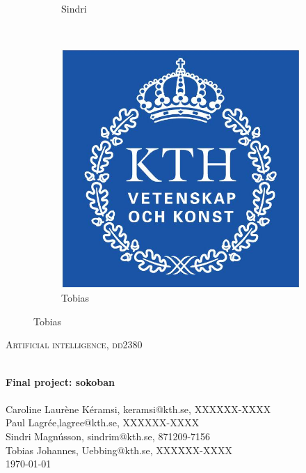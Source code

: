 \documentclass[a4paper,10pt]{article}
\begin{document}
\begin{titlepage}
\begin{center}
\begin{figure}[h]
\begin{subfigure}[b]{0.2\textwidth}
                \caption{Sindri}
                \label{fig:Sindri}
        \end{subfigure}
          ~ %
        \begin{subfigure}[b]{0.2\textwidth}
                \centering
                \includegraphics[width=\textwidth]{kth_mathematics_rgb.jpg}
                \caption{Tobias}
                \label{fig:Tobias}
        \end{subfigure}
\end{figure}

\textsc{\Large Artificial intelligence, dd2380 }  %

\hrulefill \\[0.4cm]
{ \huge \bfseries Final project: sokoban}\\[0.4cm]
\hrulefill \\[1.5cm]



    Caroline Laurène Kéramsi, keramsi@kth.se, XXXXXX-XXXX \\
    Paul Lagrée,lagree@kth.se, XXXXXX-XXXX \\
    Sindri Magnússon, sindrim@kth.se, 871209-7156 \\
    Tobias Johannes, Uebbing@kth.se, XXXXXX-XXXX \\


\vfill
{\large \today}

\end{center}
\end{titlepage}
\end{document}
